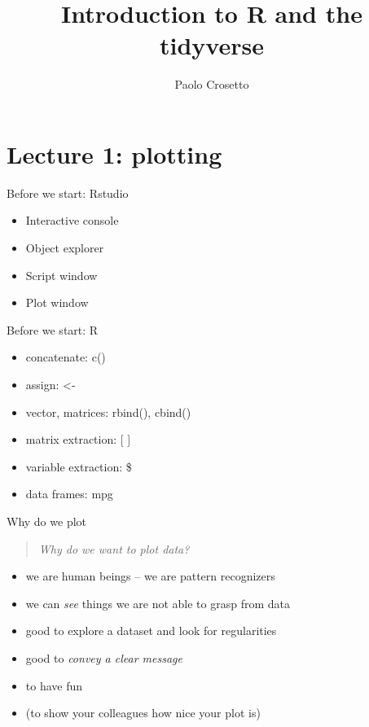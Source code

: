 \documentclass[
  ignorenonframetext,
]{beamer}
\title{Introduction to R and the tidyverse}
\author{Paolo Crosetto}
\date{}
\providecommand{\tightlist}{%
  \setlength{\itemsep}{0pt}\setlength{\parskip}{0pt}}
\begin{document}
\frame{\titlepage}

\hypertarget{lecture-1-plotting}{%
\section{Lecture 1: plotting}\label{lecture-1-plotting}}

\begin{frame}{Before we start: Rstudio}
\protect\hypertarget{before-we-start-rstudio}{}

\begin{itemize}
\tightlist
\item
  Interactive console
\item
  Object explorer
\item
  Script window
\item
  Plot window
\end{itemize}

\end{frame}

\begin{frame}{Before we start: R}
\protect\hypertarget{before-we-start-r}{}

\begin{itemize}
\tightlist
\item
  concatenate: c()
\item
  assign: \textless-
\item
  vector, matrices: rbind(), cbind()
\item
  matrix extraction: {[} {]}
\item
  variable extraction: \$
\item
  data frames: mpg
\end{itemize}

\end{frame}

\begin{frame}{Why do we plot}
\protect\hypertarget{why-do-we-plot}{}

\begin{quote}
\emph{Why do we want to plot data?}
\end{quote}

\begin{itemize}
\tightlist
\item
  we are human beings -- we are pattern recognizers
\item
  we can \emph{see} things we are not able to grasp from data
\item
  good to explore a dataset and look for regularities
\item
  good to \emph{convey a clear message}
\item
  to have fun
\item
  (to show your colleagues how nice your plot is)
\end{itemize}

\end{frame}
\end{document}
